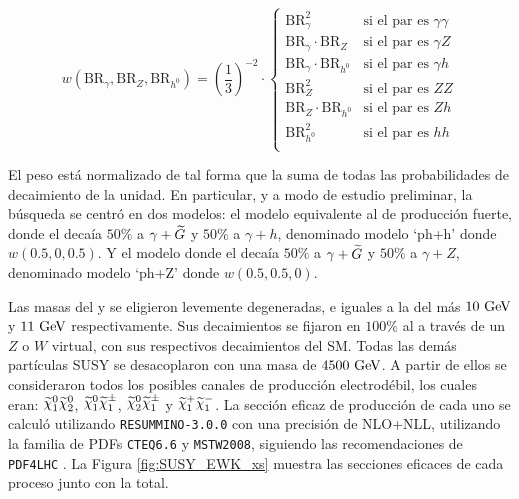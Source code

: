 

\begin{equation}
  w(\text{BR}_{\gamma}, \text{BR}_{Z}, \text{BR}_{h^{0}})=\left(\frac{1}{3}\right)^{-2}\cdot\begin{cases}
    \text{BR}_{\gamma}^{2} & \text{si el par es } \gamma\gamma \\
    \text{BR}_{\gamma}\cdot\text{BR}_{Z} & \text{si el par es } \gamma Z \\
    \text{BR}_{\gamma}\cdot\text{BR}_{h^{0}} & \text{si el par es } \gamma h \\
    \text{BR}_{Z}^{2} & \text{si el par es } ZZ \\
    \text{BR}_{Z}\cdot\text{BR}_{h^{0}} & \text{si el par es } Zh \\
    \text{BR}_{h^{0}}^{2} & \text{si el par es } hh \\
  \end{cases}
\end{equation}

El peso está normalizado de tal forma que la suma de todas las probabilidades de decaimiento de la unidad. En particular, y a modo de estudio preliminar, la búsqueda se centró en dos modelos: el modelo equivalente al de producción fuerte, donde el \ninoone decaía $50\%$ a $\gamma + \widetilde{G}$ y $50\%$ a $\gamma + h$, denominado modelo `ph+h' donde $w(0.5, 0, 0.5)$. Y el modelo donde el \ninoone decaía $50\%$ a $\gamma + \widetilde{G}$ y $50\%$ a $\gamma + Z$, denominado modelo `ph+Z' donde $w(0.5, 0.5, 0)$.

Las masas del \ninotwo y \chinopm se eligieron levemente degeneradas, e iguales a la del \ninoone más $10\ \text{GeV}$ y $11\ \text{GeV}$ respectivamente. 
Sus decaimientos se fijaron en $100\%$ al \ninoone a través de un $Z$ o $W$ virtual, con sus respectivos decaimientos del SM. Todas las demás partículas SUSY se desacoplaron con una masa de $4500\ \text{GeV}$. A partir de ellos se consideraron todos los posibles canales de producción electrodébil, los cuales eran: $\ninoone \ninotwo$, $\ninoone \chinoonepm$, $\ninotwo \chinoonepm$ y $\chinoonep \chinoonem$. La sección eficaz de producción de cada uno se calculó utilizando \texttt{RESUMMINO-3.0.0} \cite{Beenakker:1999xh,Debove:2010kf,Fuks:2012qx,Fuks:2013vua,Fiaschi:2018hgm} con una precisión de NLO+NLL, utilizando la familia de PDFs \texttt{CTEQ6.6} y \texttt{MSTW2008}, siguiendo las recomendaciones de \texttt{PDF4LHC} \cite{Butterworth:2015oua}. La Figura \ref{fig:SUSY_EWK_xs} muestra las secciones eficaces de cada proceso junto con la total.

